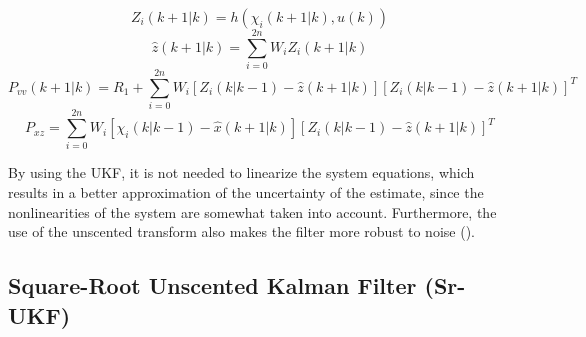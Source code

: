 \begin{equation}
    \label{eq:sec2_ukf_4}
    Z_i(k+1|k) = h(\chi_i (k+1|k), u(k))
\end{equation}
\begin{equation}
    \label{eq:sec2_ukf_5}
    \hat{z}(k+1|k) = \sum_{i=0}^{2n} W_i Z_i(k+1|k)
\end{equation}
\begin{equation}
    \label{eq:sec2_ukf_6}
    P_{vv}(k+1|k) = R_1 + \sum_{i=0}^{2n} W_i \left[ Z_i(k|k-1) - \hat{z}(k+1|k) \right] \left[ Z_i(k|k-1) - \hat{z}(k+1|k) \right]^T
\end{equation}
\begin{equation}
    \label{eq:sec2_ukf_7}
    P_{xz} = \sum_{i=0}^{2n} W_i \left[ \chi_i(k|k-1) - \hat{x}(k+1|k) \right] \left[ Z_i(k|k-1) - \hat{z}(k+1|k) \right]^T
\end{equation}

By using the UKF, it is not needed to linearize the system equations, which results in a better approximation of the uncertainty of the estimate, since the nonlinearities of the system are somewhat taken into account. Furthermore, the use of the unscented transform also makes the filter more robust to noise (\cite{wan2000unscented}).

\subsection{Square-Root Unscented Kalman Filter (Sr-UKF)}
\label{sec:sec2_sr_ukf}
